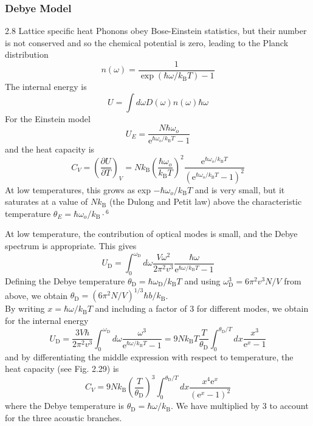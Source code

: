 \documentclass[12pt,a4paper]{article}
\begin{document}
    \subsubsection{Debye Model}
    2.8 Lattice specific heat
    Phonons obey Bose-Einstein statistics, but their number is not conserved and so the chemical potential is zero, leading to the Planck distribution
    $$
    n(\omega)=\frac{1}{\exp \left(\hbar \omega / k_{\mathrm{B}} T\right)-1}
    $$
    The internal energy is
    $$
    U=\int d \omega D(\omega) n(\omega) \hbar \omega
    $$
    For the Einstein model
    $$
    U_E=\frac{N \hbar \omega_o}{\mathrm{e}^{\hbar \omega_o / k_{\mathrm{B}} T}-1}
    $$
    and the heat capacity is
    $$
    C_V=\left(\frac{\partial U}{\partial T}\right)_V=N k_{\mathrm{B}}\left(\frac{\hbar \omega_o}{k_{\mathrm{B}} T}\right)^2 \frac{\mathrm{e}^{\hbar \omega_o / k_{\mathrm{B}} T}}{\left(\mathrm{e}^{\hbar \omega_o / k_{\mathrm{B}} T}-1\right)^2}
    $$
    At low temperatures, this grows as exp $-\hbar \omega_o / k_{\mathrm{B}} T$ and is very small, but it saturates at a value of $N k_{\mathrm{B}}$ (the Dulong and Petit law) above the characteristic temperature $\theta_E=\hbar \omega_o / k_{\mathrm{B}} \cdot{ }^6$

    At low temperature, the contribution of optical modes is small, and the Debye spectrum is appropriate. This gives
    $$
    U_{\mathrm{D}}=\int_0^{\omega_{\mathrm{D}}} d \omega \frac{V \omega^2}{2 \pi^2 v^3} \frac{\hbar \omega}{\mathrm{e}^{\hbar \omega / k_{\mathrm{B}} T}-1}
    $$
    Defining the Debye temperature $\theta_{\mathrm{D}}=\hbar \omega_{\mathrm{D}} / k_{\mathrm{B}} T$ and using $\omega_{\mathrm{D}}^3=6 \pi^2 v^3 N / V$ from above, we obtain $\theta_{\mathrm{D}}=\left(6 \pi^2 N / V\right)^{1 / 3} \hbar b / k_{\mathrm{B}}$. \\
    By writing $x=\hbar \omega / k_{\mathrm{B}} T$ and including a factor of 3 for different modes, we obtain for the internal energy
    $$
    U_{\mathrm{D}}=\frac{3 V \hbar}{2 \pi^2 v^3} \int_0^{\omega_{\mathrm{D}}} d \omega \frac{\omega^3}{\mathrm{e}^{\hbar \omega / k_{\mathrm{B}} T}-1}=9 N k_{\mathrm{B}} T \frac{T}{\theta_{\mathrm{D}}} \int_0^{\theta_{\mathrm{D}} / T} d x \frac{x^3}{\mathrm{e}^x-1}
    $$
    and by differentiating the middle expression with respect to temperature, the heat capacity (see Fig. 2.29) is
    $$
    C_V=9 N k_{\mathrm{B}}\left(\frac{T}{\theta_{\mathrm{D}}}\right)^3 \int_0^{\theta_{\mathrm{D}} / T} d x \frac{x^4 \mathrm{e}^x}{\left(\mathrm{e}^x-1\right)^2}
    $$
    where the Debye temperature is $\theta_{\mathrm{D}}=\hbar \omega / k_{\mathrm{B}}$. We have multiplied by 3 to account for the three acoustic branches.
\end{document}
